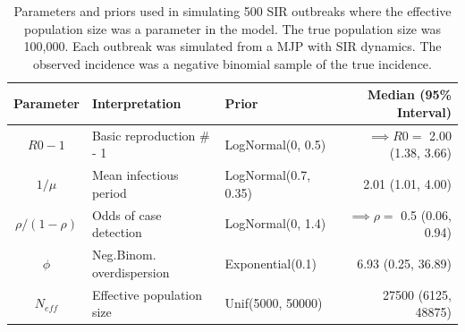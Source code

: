 \begin{table}[htbp]
	\caption[Parameters and priors for a coverage simulation when estimating the effective population size.]{Parameters and priors used in simulating 500 SIR outbreaks where the effective population size was a parameter in the model. The true population size was 100,000. Each outbreak was simulated from a MJP with SIR dynamics. The observed incidence was a negative binomial sample of the true incidence.}
	\label{tab:effpop_coverage_settings}
	\small\centering
	\begin{tabular}{cllr}
		\hline
		\textbf{Parameter} & \textbf{Interpretation} & \textbf{Prior} & \textbf{Median (95\% Interval)} \\ \hline
		$ R0-1 $ & Basic reproduction \# - 1 & LogNormal(0, 0.5) & $ \implies R0 = $ 2.00 (1.38, 3.66) \\ 
		$ 1/\mu $ & Mean infectious period & LogNormal(0.7, 0.35)& 2.01 (1.01, 4.00) \\
		$ \rho / (1-\rho) $ & Odds of case detection & LogNormal(0, 1.4) & $ \implies \rho =$ 0.5 (0.06, 0.94) \\
		$ \phi $ & Neg.Binom. overdispersion & Exponential(0.1) & 6.93 (0.25, 36.89)\\
		$ N_{eff} $ & Effective population size & Unif(5000, 50000) & 27500 (6125, 48875)\\
		\hline
	\end{tabular}
\end{table}

